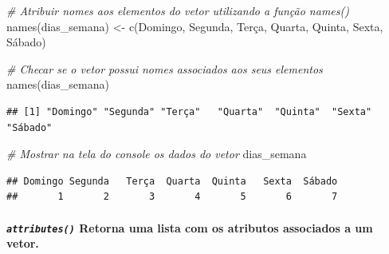 \documentclass[
]{article}
\newenvironment{Shaded}{\begin{snugshade}}{\end{snugshade}}
\newcommand{\CommentTok}[1]{\textcolor[rgb]{0.56,0.35,0.01}{\textit{#1}}}
\newcommand{\FunctionTok}[1]{\textcolor[rgb]{0.00,0.00,0.00}{#1}}
\newcommand{\NormalTok}[1]{#1}
\newcommand{\OtherTok}[1]{\textcolor[rgb]{0.56,0.35,0.01}{#1}}
\newcommand{\StringTok}[1]{\textcolor[rgb]{0.31,0.60,0.02}{#1}}
\begin{document}
\begin{Shaded}
\begin{Highlighting}[]
\CommentTok{\# Atribuir nomes aos elementos do vetor utilizando a função names()}
\FunctionTok{names}\NormalTok{(dias\_semana) }\OtherTok{\textless{}{-}} \FunctionTok{c}\NormalTok{(}\StringTok{\textquotesingle{}Domingo\textquotesingle{}}\NormalTok{, }\StringTok{\textquotesingle{}Segunda\textquotesingle{}}\NormalTok{, }\StringTok{\textquotesingle{}Terça\textquotesingle{}}\NormalTok{, }\StringTok{\textquotesingle{}Quarta\textquotesingle{}}\NormalTok{,}
                        \StringTok{\textquotesingle{}Quinta\textquotesingle{}}\NormalTok{, }\StringTok{\textquotesingle{}Sexta\textquotesingle{}}\NormalTok{, }\StringTok{\textquotesingle{}Sábado\textquotesingle{}}\NormalTok{)}
\end{Highlighting}
\end{Shaded}

\begin{Shaded}
\begin{Highlighting}[]
\CommentTok{\# Checar se o vetor possui nomes associados aos seus elementos}
\FunctionTok{names}\NormalTok{(dias\_semana)}
\end{Highlighting}
\end{Shaded}

\begin{verbatim}
## [1] "Domingo" "Segunda" "Terça"   "Quarta"  "Quinta"  "Sexta"   "Sábado"
\end{verbatim}

\begin{Shaded}
\begin{Highlighting}[]
\CommentTok{\# Mostrar na tela do console os dados do vetor}
\NormalTok{dias\_semana}
\end{Highlighting}
\end{Shaded}

\begin{verbatim}
## Domingo Segunda   Terça  Quarta  Quinta   Sexta  Sábado 
##       1       2       3       4       5       6       7
\end{verbatim}

\hypertarget{attributes-retorna-uma-lista-com-os-atributos-associados-a-um-vetor.}{%
\paragraph{\texorpdfstring{\emph{\texttt{attributes()}} Retorna uma
lista com os atributos associados a um
vetor.}{attributes() Retorna uma lista com os atributos associados a um vetor.}}\label{attributes-retorna-uma-lista-com-os-atributos-associados-a-um-vetor.}}
\end{document}

